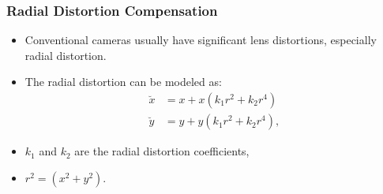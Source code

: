 \documentclass{beamer}
\begin{document}
		\begin{frame}\frametitle{Radial Distortion Compensation}
			\begin{itemize}
			 \item Conventional cameras usually have significant lens distortions, especially radial distortion.
			 \item The radial distortion can be modeled as:
			\begin{align*}
			\breve{x} &= x + x(k_1 r^2 + k_2 r^4) \\%
			\breve{y} &= y + y(k_1 r^2 + k_2 r^4), %
			\end{align*}
			\item $k_1$ and $k_2$ are the radial distortion coefficients,
			\item $r^2 = (x^2 + y^2)$.
			\end{itemize}
		\end{frame}


\end{document}
